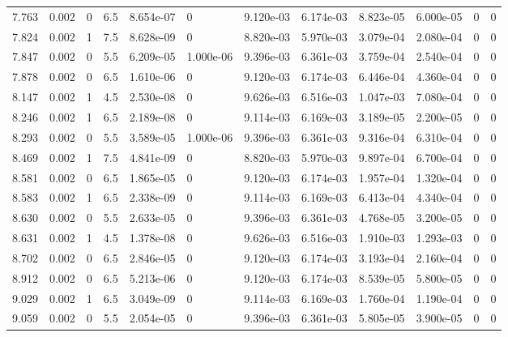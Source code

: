 \documentclass[preview]{standalone}
\begin{document}
{{{\begin{tabular}{L{1.2cm}C{1.2cm} C{0.3cm}C{0.5cm} C{1.4cm}C{1.4cm} C{1.4cm}C{1.4cm} C{1.6cm}C{1.6cm} C{1.6cm}C{1.6cm}}
  7.763  &  0.002  & 0     & 6.5 &  8.654e-07  & 0  &  9.120e-03&   6.174e-03& 8.823e-05 & 6.000e-05   &  0 & 0  \\ 
  7.824  &  0.002  & 1     & 7.5 &  8.628e-09  & 0  &  8.820e-03&   5.970e-03& 3.079e-04 & 2.080e-04   &  0 & 0  \\ 
  7.847  &  0.002  & 0     & 5.5 &  6.209e-05  & 1.000e-06  &  9.396e-03&   6.361e-03& 3.759e-04 & 2.540e-04   &  0 & 0  \\ 
  7.878  &  0.002  & 0     & 6.5 &  1.610e-06  & 0  &  9.120e-03&   6.174e-03& 6.446e-04 & 4.360e-04   &  0 & 0  \\ 
  8.147  &  0.002  & 1     & 4.5 &  2.530e-08  & 0  &  9.626e-03&   6.516e-03& 1.047e-03 & 7.080e-04   &  0 & 0  \\ 
  8.246  &  0.002  & 1     & 6.5 &  2.189e-08  & 0  &  9.114e-03&   6.169e-03& 3.189e-05 & 2.200e-05   &  0 & 0  \\ 
  8.293  &  0.002  & 0     & 5.5 &  3.589e-05  & 1.000e-06  &  9.396e-03&   6.361e-03& 9.316e-04 & 6.310e-04   &  0 & 0  \\ 
  8.469  &  0.002  & 1     & 7.5 &  4.841e-09  & 0  &  8.820e-03&   5.970e-03& 9.897e-04 & 6.700e-04   &  0 & 0  \\ 
  8.581  &  0.002  & 0     & 6.5 &  1.865e-05  & 0  &  9.120e-03&   6.174e-03& 1.957e-04 & 1.320e-04   &  0 & 0  \\ 
  8.583  &  0.002  & 1     & 6.5 &  2.338e-09  & 0  &  9.114e-03&   6.169e-03& 6.413e-04 & 4.340e-04   &  0 & 0  \\ 
  8.630  &  0.002  & 0     & 5.5 &  2.633e-05  & 0  &  9.396e-03&   6.361e-03& 4.768e-05 & 3.200e-05   &  0 & 0  \\ 
  8.631  &  0.002  & 1     & 4.5 &  1.378e-08  & 0  &  9.626e-03&   6.516e-03& 1.910e-03 & 1.293e-03   &  0 & 0  \\ 
  8.702  &  0.002  & 0     & 6.5 &  2.846e-05  & 0  &  9.120e-03&   6.174e-03& 3.193e-04 & 2.160e-04   &  0 & 0  \\ 
  8.912  &  0.002  & 0     & 6.5 &  5.213e-06  & 0  &  9.120e-03&   6.174e-03& 8.539e-05 & 5.800e-05   &  0 & 0  \\ 
  9.029  &  0.002  & 1     & 6.5 &  3.049e-09  & 0  &  9.114e-03&   6.169e-03& 1.760e-04 & 1.190e-04   &  0 & 0  \\ 
  9.059  &  0.002  & 0     & 5.5 &  2.054e-05  & 0  &  9.396e-03&   6.361e-03& 5.805e-05 & 3.900e-05   &  0 & 0  \\ 
\hline 
\end{tabular} 

}}}
\end{document}
